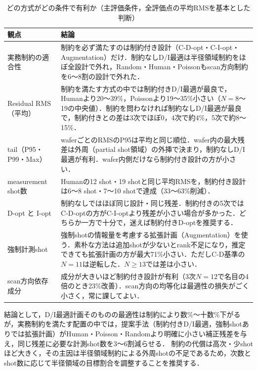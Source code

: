 \documentclass[10.5pt,a4paper]{ltjsarticle}
\begin{document}
\begin{table}[htbp]
  \centering
  \caption{どの方式がどの条件で有利か（主評価条件，全評価点の平均RMSを基本とした判断）}
  \label{tab:conclusion}
  \small
  \begin{tabular}{p{30mm}p{125mm}}
    \toprule
    観点 & 結論 \\
    \midrule
    実務制約の適合性 & 制約を必ず満たすのは制約付き設計（C-D-opt・C-I-opt・Augmentation）だけ．制約なしD/I最適は半径領域制約をほぼ全設計で外れ，Random・Human・Poissonもscan方向制約を6〜8割の設計で外れた． \\
    Residual RMS（平均） & 制約を満たす方式の中では制約付きD/I最適が最良で，Humanより20〜39\%，Poissonより19〜35\%小さい（$N=8$〜19の中央値）．制約を問わなければ制約なしD/I最適が最良で，制約付きとの差は3次でほぼ0，4次で約4\%，5次で約8〜15\%． \\
    tail（P95・P99・Max） & waferごとのRMSのP95は平均と同じ順位．wafer内の最大残差は外周（partial shot領域）の外挿で決まり，制約なしD/I最適が有利．wafer内側だけなら制約付き設計の方が小さい． \\
    measurement shot数 & Humanの12 shot・19 shotと同じ平均RMSを，制約付き設計は6〜8 shot・7〜10 shotで達成（33〜63\%削減）． \\
    D-opt と I-opt & 制約なしではほぼ同じ設計・同じ残差．制約付きの5次ではC-D-optの方がC-I-optより残差が小さい場合が多かった．どちらか一方で十分で，迷えば制約付きD-optを推奨する． \\
    強制計測shot & 強制shotの情報量を考慮する拡張計画（Augmentation）を使う．素朴な方法は追加shotが少ないとrank不足になり，推定できても拡張計画の方が最大71\%小さい．ただしC-D基準の$N=11$は逆転した．$N\ge13$では差は小さい． \\
    scan方向依存成分 & 成分が大きいほど制約付き設計が有利（3次$N=12$で名目の4倍のとき23\%改善）．scan方向の均等化は最適性の損失がごく小さく，常に課してよい． \\
    \bottomrule
  \end{tabular}
\end{table}

結論として，D/I最適計画そのものの最適性は制約により数\%〜十数\%下がるが，実務制約を満たす配置の中では，提案手法（制約付きD/I最適，強制shotありでは拡張計画）がHuman・Poisson・Randomより明確に小さい補正残差を与え，同じ残差に必要な計測shot数を3〜6割減らせる．
制約の代償は高次・少shotほど大きく，その主因は半径領域制約による外周shotの不足であるため，次数とshot数に応じて半径領域の目標割合を調整することを推奨する．

\end{document}

